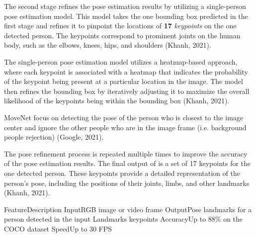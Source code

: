 The second stage refines the pose estimation results by utilizing a single-person pose estimation model. This model takes the one bounding box predicted in the first stage and refines it to pinpoint the locations of {\bf 17} {\em keypoints} on the one detected person. The keypoints correspond to prominent joints on the human body, such as the elbows, knees, hips, and shoulders (\scc Khanh, 2021).

The single-person pose estimation model utilizes a heatmap-based approach, where each keypoint is associated with a heatmap that indicates the probability of the keypoint being present at a particular location in the image. The model then refines the bounding box by iteratively adjusting it to maximize the overall likelihood of the keypoints being within the bounding box (\scc Khanh, 2021).

MoveNet focus on detecting the pose of the person who is closest to the image center and ignore the other people who are in the image frame (i.e. background people rejection) (\scc Google, 2021).

The pose refinement process is repeated multiple times to improve the accuracy of the pose estimation results. The final output of is a set of 17 keypoints for the one detected person. These keypoints provide a detailed representation of the person's pose, including the positions of their joints, limbs, and other landmarks (\scc Khanh, 2021).

    \setupTABLE[r][1][style=bold]
    \setupTABLE[c][each][offset=3dd]
    \setupTABLE[frame=off]
    \setupTABLE[r][1][topframe=on,bottomframe=on]
    \setupTABLE[c][each][leftframe=on]
    \setupTABLE[c][1][leftframe=off]
    \bTR
        \bTD Feature\eTD\bTD    Description\eTD\eTR
    \bTR
        \bTD Input\eTD\bTD	    RGB image or video frame\eTD\eTR
    \bTR
        \bTD Output\eTD\bTD	    Pose landmarks for a person detected in the input\eTD\eTR
    \bTR
        \bTD Landmarks\eTD{} keypoints\eTD\eTR
    \bTR
        \bTD Accuracy\eTD\bTD   Up to 88\% on the COCO dataset\eTD\eTR
    \bTR
        \bTD Speed\eTD\bTD	    Up to 30 FPS\eTD\eTR


